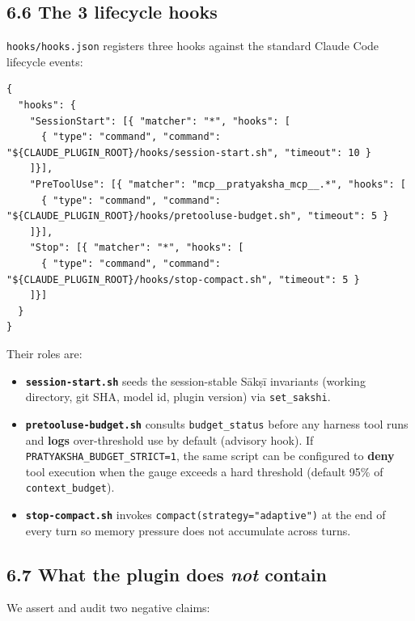 \subsection{6.6 The 3 lifecycle hooks}\label{the-3-lifecycle-hooks}

\texttt{hooks/hooks.json} registers three hooks against the standard Claude Code lifecycle events:

\begin{verbatim}
{
  "hooks": {
    "SessionStart": [{ "matcher": "*", "hooks": [
      { "type": "command", "command": "${CLAUDE_PLUGIN_ROOT}/hooks/session-start.sh", "timeout": 10 }
    ]}],
    "PreToolUse": [{ "matcher": "mcp__pratyaksha_mcp__.*", "hooks": [
      { "type": "command", "command": "${CLAUDE_PLUGIN_ROOT}/hooks/pretooluse-budget.sh", "timeout": 5 }
    ]}],
    "Stop": [{ "matcher": "*", "hooks": [
      { "type": "command", "command": "${CLAUDE_PLUGIN_ROOT}/hooks/stop-compact.sh", "timeout": 5 }
    ]}]
  }
}
\end{verbatim}

Their roles are:

\begin{itemize}
\tightlist
\item
  \textbf{\texttt{session-start.sh}} seeds the session-stable Sākṣī invariants (working directory, git SHA, model id, plugin version) via \texttt{set\_sakshi}.
\item
  \textbf{\texttt{pretooluse-budget.sh}} consults \texttt{budget\_status} before any harness tool runs and \textbf{logs} over-threshold use by default (advisory hook). If \texttt{PRATYAKSHA\_BUDGET\_STRICT=1}, the same script can be configured to \textbf{deny} tool execution when the gauge exceeds a hard threshold (default 95\% of \texttt{context\_budget}).
\item
  \textbf{\texttt{stop-compact.sh}} invokes \texttt{compact(strategy="adaptive")} at the end of every turn so memory pressure does not accumulate across turns.
\end{itemize}

\subsection{\texorpdfstring{6.7 What the plugin does \emph{not} contain}{6.7 What the plugin does not contain}}\label{what-the-plugin-does-not-contain}

We assert and audit two negative claims:

